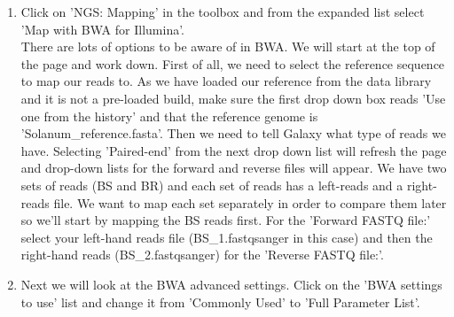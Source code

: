 \documentclass[12pt,a4paper]{article}
\begin{document}
\begin{enumerate}
	\item Click on 'NGS: Mapping' in the toolbox and from the
          expanded list select 'Map with BWA for Illumina'.  \\

          There are lots of options to be aware of in BWA. We will
          start at the top of the page and work down. First of all, we
          need to select the reference sequence to map our reads
          to. As we have loaded our reference from the data library
          and it is not a pre-loaded build, make sure the first drop
          down box reads 'Use one from the history' and that the
          reference genome is 'Solanum\_reference.fasta'. Then
          we need to tell Galaxy what type of reads we have. Selecting
          'Paired-end' from the next drop down list will refresh the
          page and drop-down lists for the forward and reverse files
          will appear. We have two sets of reads (BS and BR) and each
          set of reads has a left-reads and a right-reads file. We
          want to map each set separately in order to compare them
          later so we'll start by mapping the BS reads first. For the
          'Forward FASTQ file:' select your left-hand reads file
          (BS\_1.fastqsanger in this case) and then the right-hand
          reads (BS\_2.fastqsanger) for the 'Reverse FASTQ file:'.

	\item Next we will look at the BWA advanced settings. Click on
          the 'BWA settings to use' list and change it from 'Commonly
          Used' to 'Full Parameter List'.


\end{enumerate}
\end{document}

